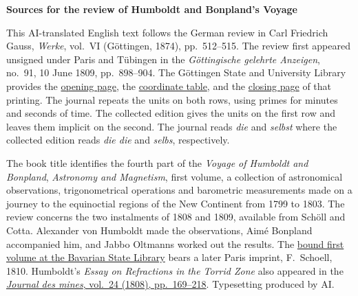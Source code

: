 \clearpage\thispagestyle{empty}
\begin{center}\textbf{Sources for the review of Humboldt and Bonpland’s Voyage}\end{center}
\noindent This AI-translated English text follows the German review in Carl Friedrich Gauss, \emph{Werke}, vol.~VI (Göttingen, 1874), pp.~512–515. The review first appeared unsigned under Paris and Tübingen in the \emph{Göttingische gelehrte Anzeigen}, no.~91, 10 June 1809, pp.~898–904. The Göttingen State and University Library provides the \href{https://images.p.sub.uni-goettingen.de/iiif/image/gdz:PPN319721507_1809:00000900/full/1750,/0/default.jpg}{opening page}, the \href{https://images.p.sub.uni-goettingen.de/iiif/image/gdz:PPN319721507_1809:00000903/full/1750,/0/default.jpg}{coordinate table}, and the \href{https://images.p.sub.uni-goettingen.de/iiif/image/gdz:PPN319721507_1809:00000906/full/1750,/0/default.jpg}{closing page} of that printing. The journal repeats the units on both rows, using primes for minutes and seconds of time. The collected edition gives the units on the first row and leaves them implicit on the second. The journal reads \emph{die} and \emph{selbst} where the collected edition reads \emph{die die} and \emph{selbs}, respectively.
\par\smallskip\noindent The book title identifies the fourth part of the \emph{Voyage of Humboldt and Bonpland}, \emph{Astronomy and Magnetism}, first volume, a collection of astronomical observations, trigonometrical operations and barometric measurements made on a journey to the equinoctial regions of the New Continent from 1799 to 1803. The review concerns the two instalments of 1808 and 1809, available from Schöll and Cotta. Alexander von Humboldt made the observations, Aimé Bonpland accompanied him, and Jabbo Oltmanns worked out the results. The \href{https://www.digitale-sammlungen.de/view/bsb10868686?page=9}{bound first volume at the Bavarian State Library} bears a later Paris imprint, F.~Schoell, 1810. Humboldt's \emph{Essay on Refractions in the Torrid Zone} also appeared in the \href{https://annales.minesparis.psl.eu/articles/1808-2/89-114.pdf}{\emph{Journal des mines}, vol.~24 (1808), pp.~169–218}. Typesetting produced by AI.
\clearpage
